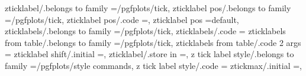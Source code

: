 {{{zticklabel/.belongs to family                                      =/pgfplots/tick,                                                                                                                    
zticklabel pos/.belongs to family                                  =/pgfplots/tick,                                                                                                                    
zticklabel pos/.code                                               ={},                                                                                            
zticklabel pos                                                     =default,                                                                                                                           
zticklabels/.belongs to family                                     =/pgfplots/tick,                                                                                                                    
zticklabels/.code                                                  ={%
zticklabels from table/.belongs to family                          =/pgfplots/tick,                                                                                                                    
zticklabels from table/.code 2 args                                ={%
zticklabel shift/.initial                                          =,                                                                                                                                  
zticklabel/.store in                                               =\pgfplots@zticklabel,                                                                                                              
z tick label style/.belongs to family                              =/pgfplots/style commands,                                                                                                          
z tick label style/.code                                           ={%
ztickmax/.initial                                                  =,                                                                                                                                  
}}}}}}
